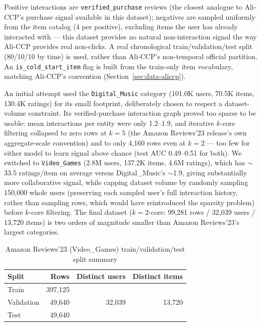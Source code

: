 \documentclass{uclthesis}
\begin{document}
Positive interactions are \texttt{verified\_purchase} reviews (the closest analogue to Ali-CCP's purchase signal available in this dataset); negatives are sampled uniformly from the item catalog (4 per positive), excluding items the user has already interacted with --- this dataset provides no natural non-interaction signal the way Ali-CCP provides real non-clicks. A real chronological train/validation/test split (80/10/10 by time) is used, rather than Ali-CCP's non-temporal official partition. An \texttt{is\_cold\_start\_item} flag is built from the train-only item vocabulary, matching Ali-CCP's convention (Section~\ref{sec:data-aliccp}).

An initial attempt used the \texttt{Digital\_Music} category (101.0K users, 70.5K items, 130.4K ratings) for its small footprint, deliberately chosen to respect a dataset-volume constraint. Its verified-purchase interaction graph proved too sparse to be usable: mean interactions per entity were only 1.2--1.9, and iterative $k$-core filtering collapsed to zero rows at $k=5$ (the Amazon Reviews'23 release's own aggregate-scale convention) and to only 4{,}160 rows even at $k=2$ --- too few for either model to learn signal above chance (test AUC 0.49--0.51 for both). We switched to \texttt{Video\_Games} (2.8M users, 137.2K items, 4.6M ratings), which has $\sim$33.5 ratings/item on average versus Digital\_Music's $\sim$1.9, giving substantially more collaborative signal, while capping dataset volume by randomly sampling 150{,}000 whole users (preserving each sampled user's full interaction history, rather than sampling rows, which would have reintroduced the sparsity problem) before $k$-core filtering. The final dataset ($k=2$-core: 99{,}281 rows / 32{,}039 users / 13{,}720 items) is two orders of magnitude smaller than Amazon Reviews'23's largest categories.

\begin{table}[h]
\centering
\caption{Amazon Reviews'23 (Video\_Games) train/validation/test split summary}
\label{tab:split-summary-amazon}
\begin{tabular}{lrrr}
\toprule
Split & Rows & Distinct users & Distinct items \\
\midrule
Train       & 397{,}125 & \multirow{3}{*}{32{,}039} & \multirow{3}{*}{13{,}720} \\
Validation  & 49{,}640  & & \\
Test        & 49{,}640  & & \\
\bottomrule
\end{tabular}
\end{table}
\end{document}
